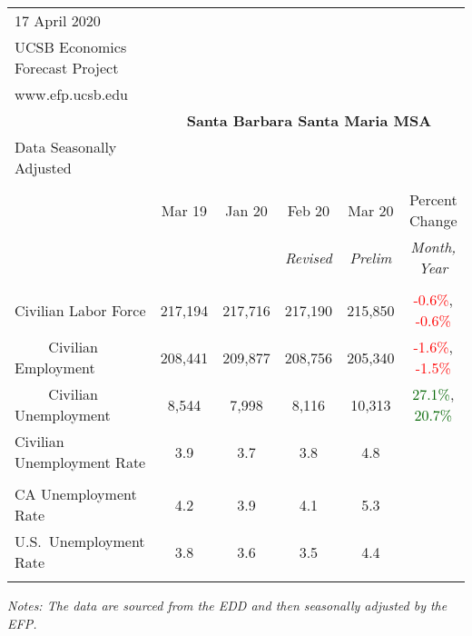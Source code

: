 \documentclass[12pt]{article}
\begin{document}
\begin{table}
\begin{tabular}{|l|c|c|c|c|c|}
\multicolumn{1}{l}{\small 17 April 2020} & \multicolumn{5}{c}{} \\
\multicolumn{1}{l}{\small UCSB Economics Forecast Project} & \multicolumn{5}{c}{} \\
\multicolumn{1}{l}{\small www.efp.ucsb.edu} & \multicolumn{5}{c}{} \\
\multicolumn{1}{c}{} & \multicolumn{5}{c}{\large \textbf{Santa Barbara Santa Maria MSA}} \\
\multicolumn{1}{l}{\small Data Seasonally Adjusted} & \multicolumn{5}{c}{} \\ \hline \hline
& & & & & \\
 & Mar 19 & Jan 20 & Feb 20 & Mar 20 & Percent Change \\
 & & & \small \textit{Revised} & \small \textit{Prelim} & \small \textit{Month, Year} \\ \hline
& & & & & \\
Civilian Labor Force & 217,194 & 217,716 & 217,190 & 215,850 & \textcolor{red}{-0.6\%}, \textcolor{red}{-0.6\%} \\
$\qquad$ \small Civilian Employment & 208,441 & 209,877 & 208,756 & 205,340 & \textcolor{red}{-1.6\%}, \textcolor{red}{-1.5\%} \\
$\qquad$ \small Civilian Unemployment & 8,544 & 7,998 & 8,116 & 10,313 & \textcolor{darkgreen}{27.1\%}, \textcolor{darkgreen}{20.7\%} \\
Civilian Unemployment Rate & 3.9 & 3.7 & 3.8 & 4.8 & \\
& & & & & \\
CA Unemployment Rate & 4.2 & 3.9 & 4.1 & 5.3 & \\
U.S.\ Unemployment Rate & 3.8 & 3.6 & 3.5 & 4.4 & \\
& & & & & \\ \hline \hline
\end{tabular}
\par
\vspace{.5em}
\footnotesize
\textit{Notes: The data are sourced from the EDD and then seasonally adjusted by the EFP.}
\end{table}
\end{document}
